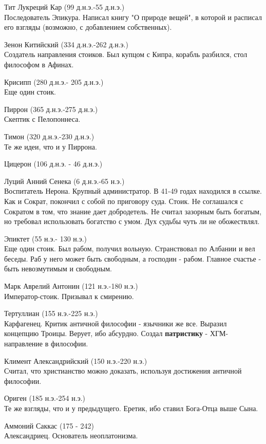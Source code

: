 \documentclass[12pt,a4paper]{article}
\begin{document}
Тит Лукреций Кар (99 д.н.э.-55 д.н.э.)\\
Последователь Эпикура. Написал книгу "О природе вещей", в которой и расписал его взгляды (возможно, с добавлением собственных).

Зенон Китийский (334 д.н.э.-262 д.н.э.)\\ 
Создатель направления стоиков. Был купцом с Кипра, корабль разбился, стол философом в Афинах. 

Крисипп (280 д.н.э.- 205 д.н.э.)\\
Еще один стоик.

Пиррон (365 д.н.э.-275 д.н.э.)\\ 
Скептик с Пелопоннеса.

Тимон (320 д.н.э.-230 д.н.э.)\\
Те же идеи, что и у Пиррона.

Цицерон (106 д.н.э. - 46 д.н.э.)

Луций Анний Сенека  (6 д.н.э.-65 н.э.)\\
Воспитатель Нерона. Крупный администратор. В 41-49 годах находился в ссылке. Как и Сократ, покончил с собой по приговору суда. Стоик. Не соглашался с Сократом в том, что знание дает добродетель. Не считал зазорным быть богатым, но требовал использовать богатство с умом. Дух судьбы чуть ли не обожествлял.

Эпиктет (55 н.э.- 130 н.э.)\\
Еще один стоик. Был рабом, получил вольную. Странствовал по Албании и вел беседы. Раб у него может быть свободным, а господин - рабом. Главное счастье - быть невозмутимым и свободным.

Марк Аврелий Антонин (121 н.э.-180 н.э.)\\
Император-стоик. Призывал к смирению.

Тертуллиан (155 н.э.-225 н.э.)\\
Карфагенец. Критик античной философии - язычники же все. Выразил концепцию Троицы. Верует, ибо абсурдно. Создал \textbf{патристику} - ХГМ-направление в философии.

Климент Александрийский (150 н.э.-220 н.э.)\\
Считал, что христианство можно доказать, используя достижения античной философии.

Ориген (185 н.э.-254 н.э.)\\
Те же взгляды, что и у предыдущего. Еретик, ибо ставил Бога-Отца выше Сына.

Аммоний Саккас (175 - 242)\\
Александриец. Основатель неоплатонизма.
\end{document}
